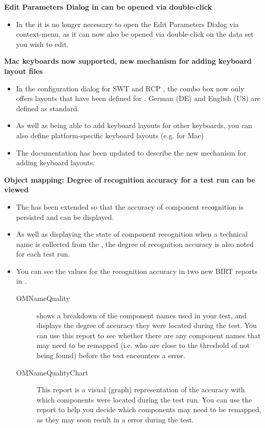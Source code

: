 \textbf{Edit Parameters Dialog in \gddataeditor{} can be opened via double-click}
\begin{itemize}
\item In the \gddataeditor{}  it is no longer necessary to open the Edit Parameters Dialog via context-menu, as it can now also be opened via double-click on the data set you wish to edit.
\end{itemize}


\textbf{Mac keyboards now supported, new mechanism for adding keyboard layout files}
\begin{itemize}
\item In the \gdaut{} configuration dialog for SWT and RCP \gdauts{}, the  combo box now only offers 
layouts that have been defined for \app{}. German (DE) and English (US) are defined as standard. 
\item As well as being able to add keyboard layouts for other keyboards, you can also define platform-specific keyboard layouts (e.g. for Mac)
\item The documentation has been updated to describe the new mechanism for adding keyboard layouts.
\end{itemize}

\textbf{Object mapping: Degree of recognition accuracy for a test run can be viewed}
\begin{itemize}
\item The \gdomeditor{} has been extended so that the accuracy of component recognition is persisted and can be displayed.  
\item As well as displaying the state of component recognition when a technical name is collected from the \gdaut{} , the degree of recognition accuracy is also noted 
for each test run. 
\item You can see the values for the recognition accuracy in two new BIRT reports in \app{}.
\begin{description}
\item [OMNameQuality]{shows a breakdown of the component names used in your test, and displays the degree of accuracy they were located during the test. You can use this report to see whether there are any component names that may need to be remapped (i.e. who are close to the threshold of not being found) before the test encounters a  error. }
\item [OMNameQualityChart]{This report is a visual (graph) representation of the accuracy with which components were located during the test run. You can use the report to help you decide which components may need to be remapped, as they may soon result in a  error during the test.}
\end{description}
\end{itemize}

